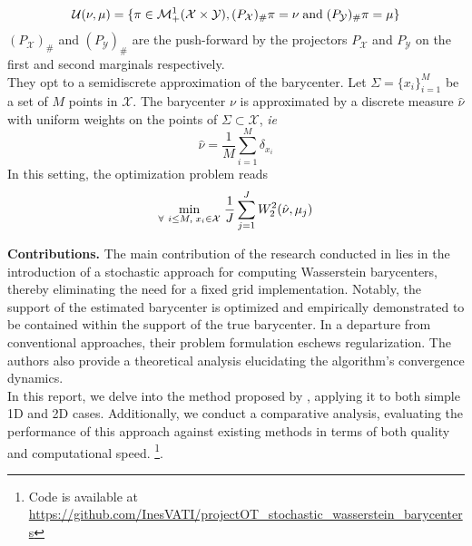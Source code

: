$$ \mathcal{U}(\nu, \mu) = \lbrace  \pi \in \mathcal{M}_+^1(\mathcal{X}\times\mathcal{Y}),  (P_\mathcal{X})_\# \pi = \nu\; \textrm{and}\; (P_\mathcal{Y} )_\# \pi = \mu  \rbrace $$
$(P_\mathcal{X} )_\#$ and $(P_\mathcal{Y} )_\#$ are the push-forward by the projectors $P_\mathcal{X}$ and $P_\mathcal{Y}$ on the first and second marginals respectively. \\

They opt to a semidiscrete approximation of the barycenter. Let $\Sigma = \lbrace x_i \rbrace_{i=1}^M$ be a set of $M$ points in $\mathcal{X}$. The barycenter $\nu$ is approximated by a discrete measure $\hat{\nu}$ with uniform weights on the points of $\Sigma\subset \mathcal{X}$, \textit{ie}
$$ \hat{\nu} = \frac{1}{M} \sum_{i=1}^M \delta_{x_i} $$ 
In this setting, the optimization problem reads 
\begin{equation}\label{eq:pbl}
     \underset{\forall\ i \leq M,\; x_i \in \mathcal{X}}{\min}\; \frac{1}{J}\sum_{j=1}^{J} W_2^2(\hat{\nu}, \mu_j)
\end{equation}

\textbf{Contributions.} The main contribution of the research conducted in \cite{claici_stochastic_2018} lies in the introduction of a stochastic approach for computing Wasserstein barycenters, thereby eliminating the need for a fixed grid implementation. Notably, the support of the estimated barycenter is optimized and empirically demonstrated to be contained within the support of the true barycenter.  In a departure from conventional approaches, their problem formulation eschews regularization. The authors also provide a theoretical analysis elucidating the algorithm's convergence dynamics. \\ 

In this report, we delve into the method proposed by \cite{claici_stochastic_2018}, applying it to both simple 1D and 2D cases. Additionally, we conduct a comparative analysis, evaluating the performance of this approach against existing methods in terms of both quality and computational speed. \footnote{Code is available at \url{https://github.com/InesVATI/projectOT_stochastic_wasserstein_barycenters}}. 